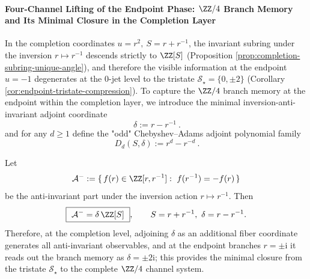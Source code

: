 \paragraph{Four-Channel Lifting of the Endpoint Phase: \texorpdfstring{$\ZZ/4$}{Z/4} Branch Memory and Its Minimal Closure in the Completion Layer}
In the completion coordinates \(u=r^{2},\ S=r+r^{-1}\), the invariant subring under the inversion \(r\mapsto r^{-1}\) descends strictly to \(\ZZ[S]\) (Proposition \ref{prop:completion-subring-unique-angle}), and therefore the visible information at the endpoint \(u=-1\) degenerates at the \(0\)-jet level to the tristate \(\mathcal S_\star=\{0,\pm 2\}\) (Corollary \ref{cor:endpoint-tristate-compression}).
To capture the \(\ZZ/4\) branch memory at the endpoint within the completion layer, we introduce the minimal inversion-anti-invariant adjoint coordinate
\begin{equation}\label{eq:endpoint-delta-anti-invariant}
\boxed{\ \delta:=r-r^{-1}\ }.
\end{equation}
and for any \(d\ge 1\) define the "odd" Chebyshev--Adams adjoint polynomial family
\begin{equation}\label{eq:endpoint-odd-chebyshev-adams}
\boxed{\ D_d(S,\delta):=r^{d}-r^{-d}\ }.
\end{equation}

\begin{remark}\label{rem:endpoint-inv-antiinv-min-closure}
Let
\[
\mathcal A^{-}:=\{\,f(r)\in \ZZ[r,r^{-1}]:\ f(r^{-1})=-f(r)\,\}
\]
be the anti-invariant part under the inversion action \(r\mapsto r^{-1}\).
Then
\[
\boxed{\ \mathcal A^{-}=\delta\,\ZZ[S]\ },\qquad S=r+r^{-1},\ \delta=r-r^{-1}.
\]
Therefore, at the completion level, adjoining \(\delta\) as an additional fiber coordinate generates all anti-invariant observables, and at the endpoint branches \(r=\pm\mathrm{i}\) it reads out the branch memory as \(\delta=\pm 2\mathrm{i}\); this provides the minimal closure from the tristate \(\mathcal S_\star\) to the complete \(\ZZ/4\) channel system.
\end{remark}

